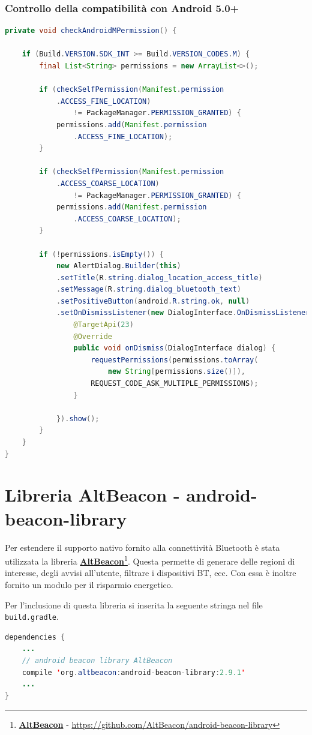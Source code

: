 \subsubsection{Controllo della compatibilità con Android 5.0+}
\begin{lstlisting}[language=Java]
private void checkAndroidMPermission() {
   	
   	if (Build.VERSION.SDK_INT >= Build.VERSION_CODES.M) {
   		final List<String> permissions = new ArrayList<>();
   		
   		if (checkSelfPermission(Manifest.permission
		   	.ACCESS_FINE_LOCATION)
		   		!= PackageManager.PERMISSION_GRANTED) {
   			permissions.add(Manifest.permission
	   			.ACCESS_FINE_LOCATION);
   		}
   		
   		if (checkSelfPermission(Manifest.permission
	   		.ACCESS_COARSE_LOCATION)
		   		!= PackageManager.PERMISSION_GRANTED) {
   			permissions.add(Manifest.permission
	   			.ACCESS_COARSE_LOCATION);
   		}
   		
   		if (!permissions.isEmpty()) {
   			new AlertDialog.Builder(this)
   			.setTitle(R.string.dialog_location_access_title)
   			.setMessage(R.string.dialog_bluetooth_text)
   			.setPositiveButton(android.R.string.ok, null)
   			.setOnDismissListener(new DialogInterface.OnDismissListener() {
   				@TargetApi(23)
   				@Override
   				public void onDismiss(DialogInterface dialog) {
   					requestPermissions(permissions.toArray(
	   					new String[permissions.size()]),
   					REQUEST_CODE_ASK_MULTIPLE_PERMISSIONS);
   				}
   				
   			}).show();
   		}
   	}
}
\end{lstlisting}

\section{Libreria AltBeacon - android-beacon-library}
Per estendere il supporto nativo fornito alla connettività Bluetooth è stata utilizzata la libreria \href{https://github.com/AltBeacon/android-beacon-library}{\textbf{AltBeacon}}\footnote{\href{https://github.com/AltBeacon/android-beacon-library}{\textbf{AltBeacon}} - \url{https://github.com/AltBeacon/android-beacon-library}}. Questa permette di generare delle regioni di interesse, degli avvisi all'utente, filtrare i dispositivi BT, ecc. Con essa è inoltre fornito un modulo per il risparmio energetico.

Per l'inclusione di questa libreria si inserita la seguente stringa nel file \texttt{build.gradle}.
\begin{lstlisting}[language=Java]
dependencies {
	...
	// android beacon library AltBeacon
	compile 'org.altbeacon:android-beacon-library:2.9.1'
	...
}
\end{lstlisting}

